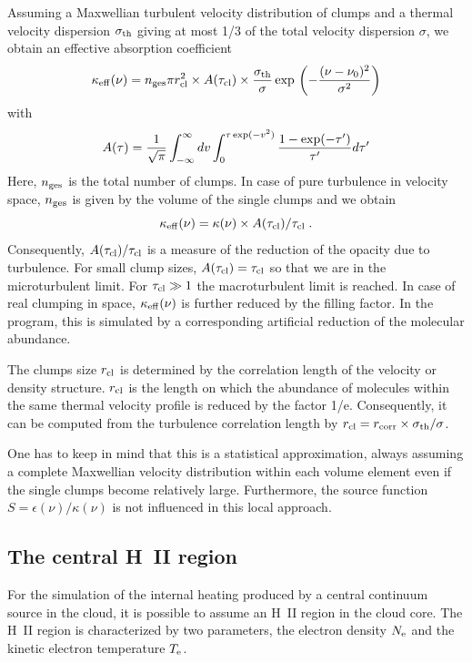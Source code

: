 Assuming a Maxwellian turbulent velocity distribution of clumps
and a thermal velocity dispersion $\sigma_{\rm th}$ giving at most
1/3 of the total velocity dispersion $\sigma$, we obtain
an effective absorption coefficient
\begin{equation}
\kappa_{\rm eff}(\nu)=n_{\rm ges} \pi r_{\rm cl}^2 \times A(\tau_{\rm cl})
\times {\sigma_{\rm th} \over \sigma} \exp{}\left(-{(\nu-\nu_0)^2
\over \sigma^2}\right)
\end{equation}
with 
\begin{equation}
A(\tau)={1\over \sqrt{\pi}}\int_{-\infty}^{\infty}dv
\int_0^{\tau \exp(-v^2)} {1-\exp(-\tau') \over \tau'} d\tau'
\end{equation}
Here, $n_{\rm ges}$ is the total number of clumps. In case of
pure turbulence in velocity space, $n_{\rm ges}$ is given by the
volume of the single clumps and we obtain
\begin{equation}
\kappa_{\rm eff}(\nu)=\kappa(\nu)\times A(\tau_{\rm cl})/\tau_{\rm cl}\;.
\end{equation}
Consequently, $A(\tau_{\rm cl})/\tau_{\rm cl}$ is a measure of the reduction
of the opacity due to turbulence. For small clump sizes, $A(\tau_{\rm cl})
= \tau_{\rm cl}$ so that we are in the microturbulent limit. For
$\tau_{\rm cl}\gg 1$ the macroturbulent limit is reached.
In case of real clumping in space, $\kappa_{\rm eff}(\nu)$ is further reduced
by the filling factor. In the program, this is simulated by a corresponding
artificial reduction of the molecular abundance.

The clumps size $r_{\rm cl}$ is determined by the correlation length
of the velocity or density structure. $r_{\rm cl}$ is the length on 
which the abundance of molecules within the same thermal velocity profile 
is reduced by the factor 1/e. Consequently, it can be computed from the 
turbulence correlation length by $r_{\rm cl}=r_{\rm corr}\times \sigma_{\rm th}
/\sigma$.  

One has to keep in mind that this is a statistical approximation,
always assuming a complete Maxwellian velocity distribution within each
volume element even if the single clumps become relatively large.
Furthermore, the source function $S=\epsilon(\nu)/\kappa(\nu)$ is not 
influenced in this local approach.

\subsection{The central H~II region}

For the simulation of the internal heating produced by a central continuum 
source in the cloud, it is possible to assume an H~II region in the cloud core.
The H~II region is characterized by two parameters, the electron density
$N_{\rm e}$ and the kinetic electron temperature $T_{\rm e}$.

